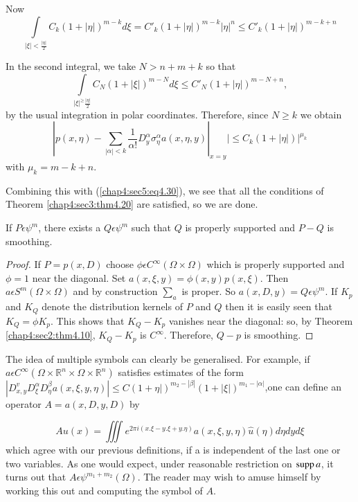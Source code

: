 Now\pageoriginale
$$
\int\limits_{|\xi|< \frac{|\eta|}{2}} C_k (1+ |\eta|)^{m-k} d \xi=
C'_k (1+|\eta|)^{m-k} |\eta|^n \le C'_k (1+ |\eta|)^{m-k+n} 
$$

In the second integral, we take $N > n +m + k$ so that 
$$
\int \limits_{|\xi|^ \ge \frac{|\eta|}{2}}C_N (1+ |\xi|)^{m-N} d \xi
\le C'_N (1+|\eta|)^{m-N+n}, 
$$
by the usual integration in polar coordinates. Therefore, since $N \ge
k$ we obtain 
$$
|p (x, \eta)- \sum_{|\alpha|<k} \frac {1}{\alpha !} D^{\alpha }_y
\sigma ^\alpha _\eta a(x, \eta, y)|_{x=y}|\le C_k (1+ |\eta|)|^
       {\mu_k} 
$$
with $\mu _k=m-k+n$.

Combining this with (\ref{chap4:sec5:eq4.30}), we see that all the conditions of
Theorem \ref{chap4:sec3:thm4.20} are satisfied, so we are done. 

\setcounter{coro}{30}
\begin{coro}\label{chap4:sec5:coro4.31}%
  If $P \epsilon \psi ^m$, there exists a $Q \epsilon \psi^m$
  such that $Q$ is properly supported and $P - Q$ is smoothing. 
\end{coro}

\begin{proof}
  If $P= p(x,D)$ choose $\phi \epsilon C^ \infty (\Omega \times
  \Omega)$ which is properly supported and $\phi =1$ near the
  diagonal. Set $a(x, \xi, y)= \phi (x,y)p (x,\xi)$. Then $a \epsilon
  S^m (\Omega \times \Omega)$ and by construction $\sum_a$ is proper. So
  $a(x,D,y)= Q \epsilon \psi ^m$. If $K_p$ and $K_Q$ denote the
  distribution kernels of $P$ and $Q$ then it is easily seen that $K_Q=
  \phi K_p$. This shows that $K_Q- K_p$ vanishes near the diagonal: so,
  by Theorem \ref{chap4:sec2:thm4.10}, $K_ Q- K_p$ is $C^
  \infty$. Therefore, $Q-p$ is smoothing. 
\end{proof}

\setcounter{rem}{31}
\begin{rem}\label{chap4:sec5:rem4.32}%
  The idea of multiple symbols can clearly be generalised. For example,
  if $a \epsilon C^ \infty (\Omega \times \mathbb{R}^n \times \Omega
  \times \mathbb{R}^n)$ satisfies estimates of the form $|D^v_{x,y} D^ \alpha _
  \xi D^ \beta _ \eta a(x, \xi, y, \eta)| \le C (1+ \eta|)^{m_2
    -|\beta|} (1+ |\xi|)^{m_1-|\alpha|}$,\pageoriginale  one can
  define an operator $A=a(x,D,y,D)$ by 
\end{rem}
$$
Au (x)= \iiint e^{2 \pi i(x. \xi-y. \xi+y. \eta)} a (x,\xi, y, \eta)
\hat{u}(\eta) d \eta dy d \xi 
$$
which agree with our previous definitions, if a is independent of the
last one or two variables. As one would expect, under reasonable
restriction on $\operatorname{supp} a$, it turns out that $A \epsilon \psi
^{m_1+m_2}(\Omega)$. The reader may wish to amuse himself by working
this out and computing the symbol of $A$. 

